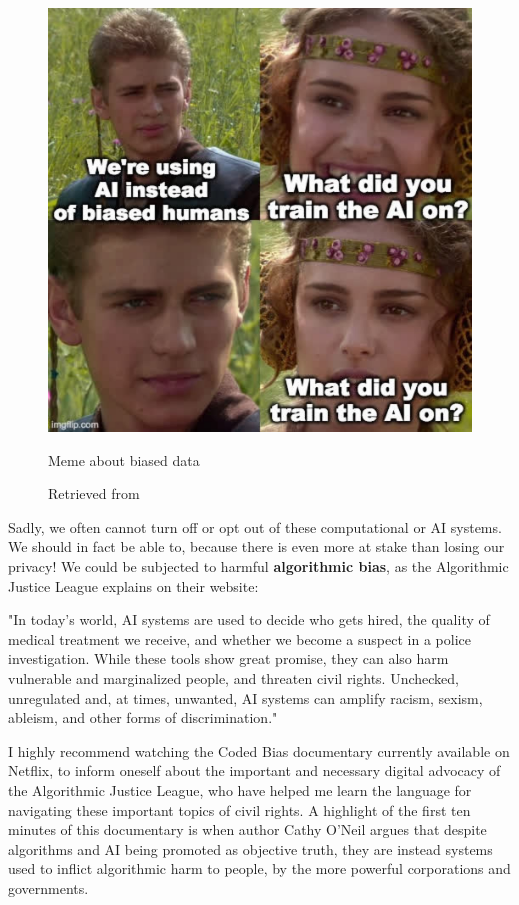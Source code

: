 \begin{figure}[ht]
  \centering
  \includegraphics[width=0.75\linewidth,height=0.40\textheight,keepaspectratio]{images/meme-star-wars.jpg}
  \caption{Meme about biased data}
  \caption*{Retrieved from \cite{website-twitter-janellecshane-meme}}
  \label{fig:meme-star-wars}
\end{figure}

Sadly, we often cannot turn off or opt out of these computational or \acrshort{AI} systems. We should in fact be able to, because there is even more at stake than losing our privacy! We could be subjected to harmful \textbf{algorithmic bias}, as the Algorithmic Justice League \cite{website-algorithmic-justice-league} explains on their website:

\begin{displayquote}
"In today’s world, AI systems are used to decide who gets hired, the quality of medical treatment we receive, and whether we become a suspect in a police investigation. While these tools show great promise, they can also harm vulnerable and marginalized people, and threaten civil rights. Unchecked, unregulated and, at times, unwanted, AI systems can amplify racism, sexism, ableism, and other forms of discrimination."
\end{displayquote}

I highly recommend watching the Coded Bias documentary \cite{website-coded-bias} currently available on Netflix, to inform oneself about the important and necessary digital advocacy of the Algorithmic Justice League, who have helped me learn the language for navigating these important topics of civil rights. A highlight of the first ten minutes of this documentary is when author Cathy O'Neil argues that despite algorithms and \acrshort{AI} being promoted as objective truth, they are instead systems used to inflict algorithmic harm to people, by the more powerful corporations and governments.

